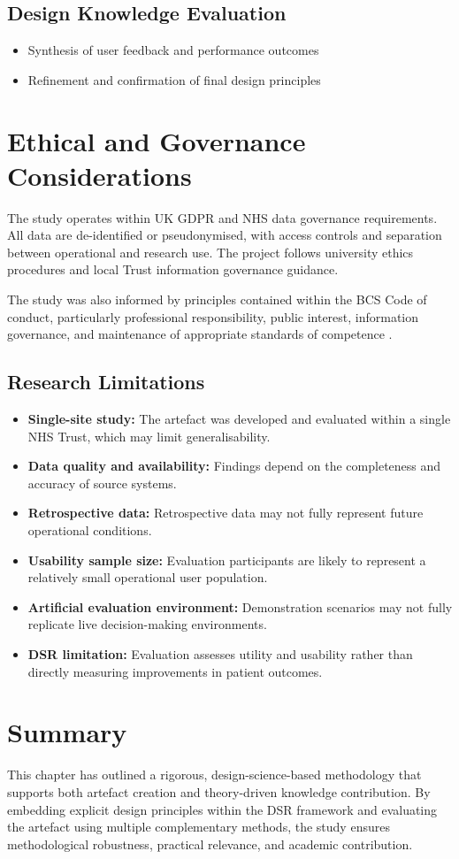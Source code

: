 \subsection{Design Knowledge Evaluation}
\begin{itemize}
    \item Synthesis of user feedback and performance outcomes
    \item Refinement and confirmation of final design principles
\end{itemize}

\section{Ethical and Governance Considerations}
The study operates within UK GDPR and NHS data governance requirements. All data are de-identified or pseudonymised, with access controls and separation between operational and research use. The project follows university ethics procedures and local Trust information governance guidance.

The study was also informed by principles contained within the BCS Code of conduct, particularly professional responsibility, public interest, information governance, and maintenance of appropriate standards of competence \citep{bcs2022}. 

\subsection{Research Limitations}

\begin{itemize}
    \item \textbf{Single-site study:} The artefact was developed and evaluated within a single NHS Trust, which may limit generalisability.
    \item \textbf{Data quality and availability:} Findings depend on the completeness and accuracy of source systems.
    \item \textbf{Retrospective data:} Retrospective data may not fully represent future operational conditions.
    \item \textbf{Usability sample size:} Evaluation participants are likely to represent a relatively small operational user population. 
    \item \textbf{Artificial evaluation environment:} Demonstration scenarios may not fully replicate live decision-making environments.
    \item \textbf{DSR limitation:} Evaluation assesses utility and usability rather than directly measuring improvements in patient outcomes.
\end{itemize}
\section{Summary}
This chapter has outlined a rigorous, design-science-based methodology that supports both artefact creation and theory-driven knowledge contribution. By embedding explicit design principles within the DSR framework and evaluating the artefact using multiple complementary methods, the study ensures methodological robustness, practical relevance, and academic contribution.
